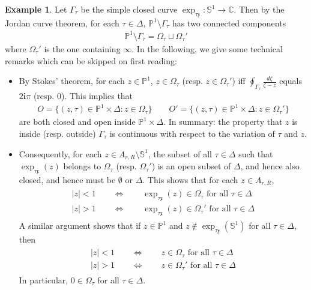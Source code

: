 \documentclass[11pt,b5paper,notitlepage]{article}
\theoremstyle{definition}
\newtheorem{eg}[df]{Example}
\theoremstyle{plain}
\newcommand{\xk}{\mathfrak x}
\newcommand{\im}{\mathbf{i}}
\newcommand{\Cbb}{\mathbb C}
\newcommand{\Pbb}{\mathbb P}
\newcommand{\Sbb}{{\mathbb S}}
\numberwithin{equation}{section}
\begin{document}
\begin{eg}
Let $\Gamma_\tau$ be the simple closed curve $\exp_{\tau\xk}:\Sbb^1\rightarrow\Cbb$. Then by the Jordan curve theorem, for each $\tau\in\Delta$, $\Pbb^1\setminus\Gamma_\tau$ has two connected components
\begin{align*}
\Pbb^1\setminus\Gamma_\tau=\Omega_\tau\sqcup\Omega_\tau' 
\end{align*}
where $\Omega_\tau'$ is the one containing $\infty$. In the following, we give some technical remarks which can be skipped on first reading:
\begin{itemize}
\item By Stokes' theorem, for each $z\in\Pbb^1$, $z\in \Omega_\tau$ (resp. $z\in\Omega_\tau'$) iff $\oint_{\Gamma_\tau}\frac {d\zeta}{\zeta-z}$ equals $2\im\pi$ (resp. 0). This implies that
\begin{align*}
O=\{(z,\tau)\in\Pbb^1\times\Delta:z\in\Omega_\tau\}\qquad O'=\{(z,\tau)\in\Pbb^1\times\Delta:z\in\Omega_\tau'\}
\end{align*}
are both closed and open inside $\Pbb^1\times\Delta$. In summary: the property that $z$ is inside (resp. outside) $\Gamma_\tau$ is continuous with respect to the variation of $\tau$ and $z$.
\item Consequently, for each $z\in A_{r,R}\setminus\Sbb^1$, the subset of all $\tau\in\Delta$ such that  $\exp_{\tau\xk}(z)$ belongs to $\Omega_\tau$ (resp. $\Omega_\tau'$) is an open subset of $\Delta$, and hence also closed, and hence must be $\emptyset$ or $\Delta$. This shows that for each $z\in A_{r,R}$,
\begin{gather}\label{eq208}
\begin{gathered}
|z|<1\qquad\Longleftrightarrow\qquad\exp_{\tau\xk}(z)\in\Omega_\tau\text{ for all }\tau\in \Delta\\
|z|>1\qquad\Longleftrightarrow\qquad\exp_{\tau\xk}(z)\in\Omega_\tau'\text{ for all }\tau\in \Delta
\end{gathered}
\end{gather}
A similar argument shows that if $z\in\Pbb^1$ and $z\notin\exp_{\tau\xk}(\Sbb^1)$ for all $\tau\in\Delta$, then
\begin{gather}\label{eq209}
\begin{gathered}
|z|<1\qquad\Longleftrightarrow\qquad z\in\Omega_\tau\text{ for all }\tau\in \Delta\\
|z|>1\qquad\Longleftrightarrow\qquad z\in\Omega_\tau'\text{ for all }\tau\in \Delta
\end{gathered}
\end{gather}
In particular, $0\in\Omega_\tau$ for all $\tau\in\Delta$.
\end{itemize}


\end{eg}
\end{document}
